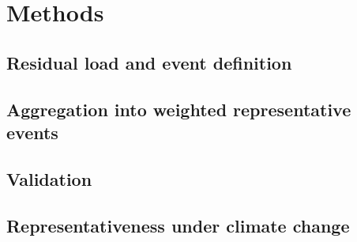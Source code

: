 \section{Methods}
\label{sec:methods}
\subsection{Residual load and event definition}
\label{sec:event_definition}

\subsection{Aggregation into weighted representative events}
\label{sec:aggregation}

\subsection{Validation}
\label{sec:validation}

\subsection{Representativeness under climate change}
\label{sec:climate}
